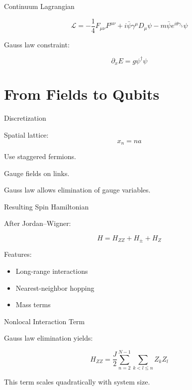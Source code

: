 \documentclass[11pt]{beamer}
\begin{document}
\begin{frame}{Continuum Lagrangian}

\[
\mathcal{L}
=
-\frac14 F_{\mu\nu}F^{\mu\nu}
+ i\bar\psi\gamma^\mu D_\mu\psi
- m\bar\psi e^{i\theta\gamma_5}\psi
\]

Gauss law constraint:

\[
\partial_x E = g \psi^\dagger \psi
\]
\end{frame}

\section{From Fields to Qubits}

\begin{frame}{Discretization}

Spatial lattice:
\[
x_n = n a
\]

Use staggered fermions.

Gauge fields on links.

Gauss law allows elimination of gauge variables.
\end{frame}

\begin{frame}{Resulting Spin Hamiltonian}

After Jordan–Wigner:

\[
H = H_{ZZ} + H_{\pm} + H_Z
\]

Features:

\begin{itemize}
\item Long-range interactions
\item Nearest-neighbor hopping
\item Mass terms
\end{itemize}
\end{frame}

\begin{frame}{Nonlocal Interaction Term}

Gauss law elimination yields:

\[
H_{ZZ}
=
\frac{J}{2}
\sum_{n=2}^{N-1}
\sum_{k<l\le n}
Z_k Z_l
\]

This term scales quadratically with system size.
\end{frame}

\end{document}
